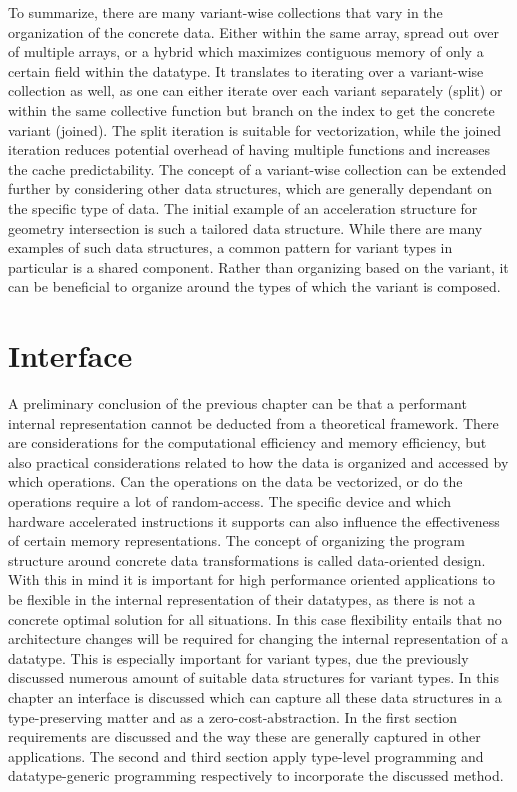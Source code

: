 \documentclass{article}
\begin{document}
To summarize, there are many variant-wise collections that vary in the organization of the concrete data. 
Either within the same array, spread out over of multiple arrays, or a hybrid which maximizes contiguous memory of only a certain field within the datatype. 
It translates to iterating over a variant-wise collection as well, as one can either iterate over each variant separately (split) or within the same collective function but branch on the index to get the concrete variant (joined).
The split iteration is suitable for vectorization, while the joined iteration reduces potential overhead of having multiple functions and increases the cache predictability.
The concept of a variant-wise collection can be extended further by considering other data structures, which are generally dependant on the specific type of data.
The initial example of an acceleration structure for geometry intersection is such a tailored data structure.
While there are many examples of such data structures, a common pattern for variant types in particular is a shared component.
Rather than organizing based on the variant, it can be beneficial to organize around the types of which the variant is composed.

\newpage

\section{Interface}

A preliminary conclusion of the previous chapter can be that a performant internal representation cannot be deducted from a theoretical framework.
There are considerations for the computational efficiency and memory efficiency, but also practical considerations related to how the data is organized and accessed by which operations.
Can the operations on the data be vectorized, or do the operations require a lot of random-access.
The specific device and which hardware accelerated instructions it supports can also influence the effectiveness of certain memory representations.
The concept of organizing the program structure around concrete data transformations is called data-oriented design.
With this in mind it is important for high performance oriented applications to be flexible in the internal representation of their datatypes, as there is not a concrete optimal solution for all situations.
In this case flexibility entails that no architecture changes will be required for changing the internal representation of a datatype.
This is especially important for variant types, due the previously discussed numerous amount of suitable data structures for variant types.
In this chapter an interface is discussed which can capture all these data structures in a type-preserving matter and as a zero-cost-abstraction. 
In the first section requirements are discussed and the way these are generally captured in other applications.
The second and third section apply type-level programming and datatype-generic programming respectively to incorporate the discussed method.
\end{document}
